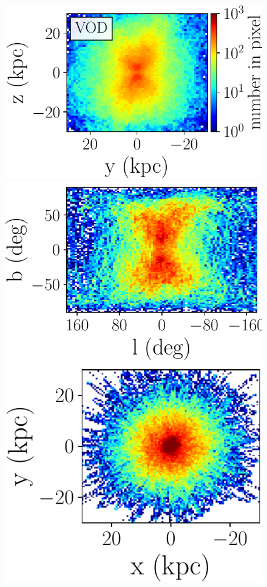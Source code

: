 \documentclass[a4paper,useAMS,usenatbib]{mnras}
\begin{document}
\begin{figure}
             \includegraphics[scale=0.302]{VOD_orbits_8Gyrs_yz_defaultmass.pdf}\\ \includegraphics[scale=0.302]{VOD_orbits_8Gyrs_lb_sausage.pdf}
             \includegraphics[scale=0.302]{VOD_orbits_8Gyrs_xy_sausage.pdf}

\end{figure}
\end{document}
